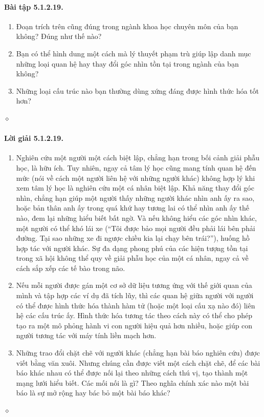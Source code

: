 \paragraph{Bài tập 5.1.2.19.}
\begin{enumerate}[label=\alph*.]
\item Đoạn trích trên cũng đúng trong ngành khoa học chuyên môn của bạn không? Đúng như thế nào?
\item Bạn có thể hình dung một cách mà lý thuyết phạm trù giúp lập danh mục những loại quan hệ hay thay đổi góc nhìn tồn tại trong ngành của bạn không?
\item Những loại cấu trúc nào bạn thường dùng xứng đáng được hình thức hóa tốt hơn?
\end{enumerate}\hfill$\diamond$
\paragraph{Lời giải 5.1.2.19.}
\begin{enumerate}[label=\alph*.]
\item Nghiên cứu một người một cách biệt lập, chẳng hạn trong bối cảnh giải phẫu học, là hữu ích. Tuy nhiên, ngay cả tâm lý học cũng mang tính quan hệ đến mức (nói về cách một người liên hệ với những người khác) không hợp lý khi xem tâm lý học là nghiên cứu một cá nhân biệt lập. Khả năng thay đổi góc nhìn, chẳng hạn giúp một người thấy những người khác nhìn anh ấy ra sao, hoặc bản thân anh ấy trong quá khứ hay tương lai có thể nhìn anh ấy thế nào, đem lại những hiểu biết bất ngờ. Và nếu không hiểu các góc nhìn khác, một người có thể khó lái xe (``Tôi được bảo mọi người đều phải lái bên phải đường. Tại sao những xe đi ngược chiều kia lại chạy bên trái?''), huống hồ hợp tác với người khác. Sự đa dạng phong phú của các hiện tượng tồn tại trong xã hội không thể quy về giải phẫu học của một cá nhân, ngay cả về cách sắp xếp các tế bào trong não.
\item Nếu mỗi người được gán một cơ sở dữ liệu tương ứng với thế giới quan của mình và tập hợp các ví dụ đã tích lũy, thì các quan hệ giữa người với người có thể được hình thức hóa thành hàm tử (hoặc một loại cấu xạ nào đó) liên hệ các cấu trúc ấy. Hình thức hóa tương tác theo cách này có thể cho phép tạo ra một mô phỏng hành vi con người hiệu quả hơn nhiều, hoặc giúp con người tương tác với máy tính liền mạch hơn.
\item Những trao đổi chặt chẽ với người khác (chẳng hạn bài báo nghiên cứu) được viết bằng văn xuôi. Nhưng chúng cần được viết một cách chặt chẽ, để các bài báo khác nhau có thể được nối lại theo những cách thú vị, tạo thành một mạng lưới hiểu biết. Các mối nối là gì? Theo nghĩa chính xác nào một bài báo là sự mở rộng hay bác bỏ một bài báo khác?
\end{enumerate}\hfill$\diamond$
